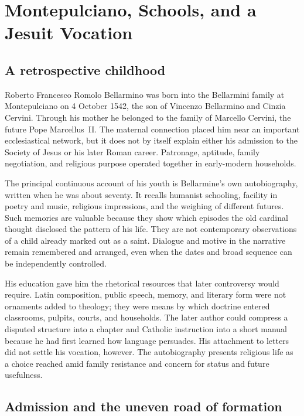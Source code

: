 \section{Montepulciano, Schools, and a Jesuit Vocation}

\subsection{A retrospective childhood}

Roberto Francesco Romolo Bellarmino was born into the Bellarmini family at
Montepulciano on 4 October 1542, the son of Vincenzo Bellarmino and Cinzia
Cervini.  Through his mother he belonged
to the family of Marcello Cervini, the future Pope Marcellus~II.  The maternal
connection placed him near an important ecclesiastical network, but it does
not by itself explain either his admission to the Society of Jesus or his
later Roman career.  Patronage, aptitude, family negotiation, and religious
purpose operated together in early-modern households.

The principal continuous account of his youth is Bellarmine's own
autobiography, written when he was about seventy.  It recalls humanist
schooling, facility in poetry and music, religious impressions, and the
weighing of different futures.  Such memories are valuable because they show
which episodes the old cardinal thought disclosed the pattern of his life.
They are not contemporary observations of a child already marked out as a
saint.  Dialogue and motive in the narrative remain remembered and arranged,
even when the dates and broad sequence can be independently controlled.

His education gave him the rhetorical resources that later controversy would
require.  Latin composition, public speech, memory, and literary form were not
ornaments added to theology; they were means by which doctrine entered
classrooms, pulpits, courts, and households.  The later author could compress
a disputed structure into a chapter and Catholic instruction into a short
manual because he had first learned how language persuades.  His attachment to
letters did not settle his vocation, however.  The autobiography presents
religious life as a choice reached amid family resistance and concern for
status and future usefulness.

\subsection{Admission and the uneven road of formation}

